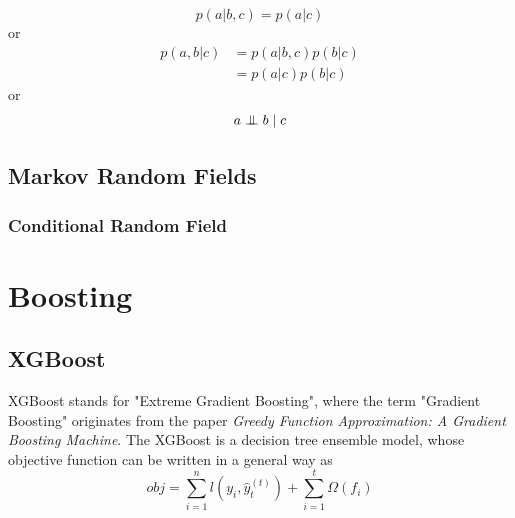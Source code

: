 \documentclass[a3paper, 12pt]{book} %
\newcommand{\CI}{\mathrel{\perp\mspace{-10mu}\perp}}
\begin{document}
\begin{equation}
p(a|b,c)=p(a|c)
\end{equation}
or 
\begin{equation}
\begin{split}
p(a,b|c) &=p(a|b,c)p(b|c) \\
&=p(a|c)p(b|c)
\end{split}
\end{equation}
or 
\begin{equation}
a \CI b \mid c
\end{equation}
\section{Markov Random Fields}
\subsection{Conditional Random Field}

\chapter{Boosting}
\section{XGBoost}
XGBoost stands for "Extreme Gradient Boosting", where the term "Gradient Boosting" originates from the paper \emph{Greedy Function Approximation: A Gradient Boosting Machine}. The XGBoost is a decision tree ensemble model, whose objective function can be written in a general way as 
$$obj=\sum_{i=1}^{n}{l(y_i,\hat{y}_{t}^{(t)})+\sum_{i=1}^{t}{\Omega{(f_i)}}}$$
\end{document}
